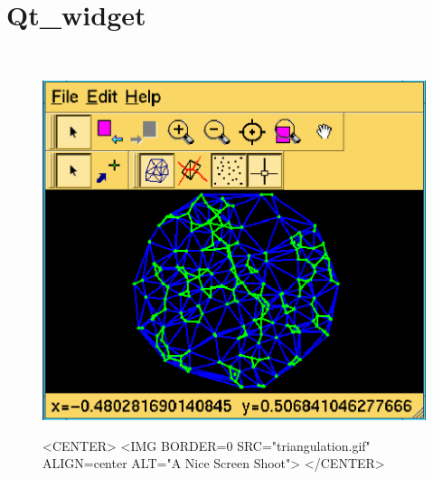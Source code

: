 
\newcommand{\qt}{{\em Qt}}      %

\gdef\lciIfHtmlClassLinks{\lcFalse}
\gdef\lciIfHtmlRefLinks{\lcFalse}
\gdef\lciIfHtmlLinks{\lcFalse}

\chapter{Qt\_widget}
\label{chapterQtwidget}

\\


\begin{figure}[h]
\begin{ccTexOnly}
\begin{center}
\includegraphics{triangulation.eps} 
\end{center}
\end{ccTexOnly}
\begin{ccHtmlOnly}
<CENTER>
<IMG BORDER=0 SRC="triangulation.gif"  ALIGN=center  ALT="A Nice Screen Shoot">
</CENTER>
\end{ccHtmlOnly}
\end{figure}

